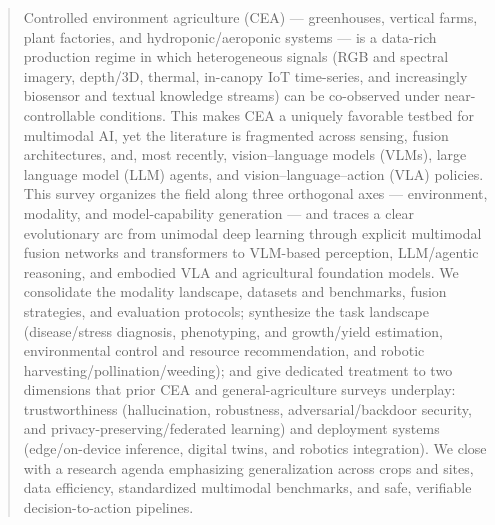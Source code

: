 \documentclass[lettersize,journal]{IEEEtran}
\begin{document}
\begin{abstract}
Controlled environment agriculture (CEA) — greenhouses, vertical farms, plant factories, and hydroponic/aeroponic systems — is a data-rich production regime in which heterogeneous signals (RGB and spectral imagery, depth/3D, thermal, in-canopy IoT time-series, and increasingly biosensor and textual knowledge streams) can be co-observed under near-controllable conditions. This makes CEA a uniquely favorable testbed for multimodal AI, yet the literature is fragmented across sensing, fusion architectures, and, most recently, vision–language models (VLMs), large language model (LLM) agents, and vision–language–action (VLA) policies. This survey organizes the field along three orthogonal axes — environment, modality, and model-capability generation — and traces a clear evolutionary arc from unimodal deep learning through explicit multimodal fusion networks and transformers to VLM-based perception, LLM/agentic reasoning, and embodied VLA and agricultural foundation models. We consolidate the modality landscape, datasets and benchmarks, fusion strategies, and evaluation protocols; synthesize the task landscape (disease/stress diagnosis, phenotyping, and growth/yield estimation, environmental control and resource recommendation, and robotic harvesting/pollination/weeding); and give dedicated treatment to two dimensions that prior CEA and general-agriculture surveys underplay: trustworthiness (hallucination, robustness, adversarial/backdoor security, and privacy-preserving/federated learning) and deployment systems (edge/on-device inference, digital twins, and robotics integration). We close with a research agenda emphasizing generalization across crops and sites, data efficiency, standardized multimodal benchmarks, and safe, verifiable decision-to-action pipelines.


\end{abstract}
\end{document}
